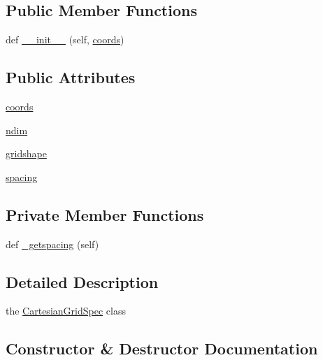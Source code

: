 \subsection*{Public Member Functions}
\begin{DoxyCompactItemize}
\item 
def \hyperlink{classMain__PDE__Repo_1_1src_1_1grid_1_1CartesianGridSpec_a498dc52b08d571018cab1684316284a3}{\+\_\+\+\_\+init\+\_\+\+\_\+} (self, \hyperlink{classMain__PDE__Repo_1_1src_1_1grid_1_1CartesianGridSpec_adf422e34fb909d26139dfb3db38f9582}{coords})
\end{DoxyCompactItemize}
\subsection*{Public Attributes}
\begin{DoxyCompactItemize}
\item 
\hyperlink{classMain__PDE__Repo_1_1src_1_1grid_1_1CartesianGridSpec_adf422e34fb909d26139dfb3db38f9582}{coords}
\item 
\hyperlink{classMain__PDE__Repo_1_1src_1_1grid_1_1CartesianGridSpec_a67aedcf0f66a3c94c10bd8129011592b}{ndim}
\item 
\hyperlink{classMain__PDE__Repo_1_1src_1_1grid_1_1CartesianGridSpec_a1a5feea284988ffe55d598a93c1cc524}{gridshape}
\item 
\hyperlink{classMain__PDE__Repo_1_1src_1_1grid_1_1CartesianGridSpec_a3f6d8ebd0c81cce8fc602ff730608367}{spacing}
\end{DoxyCompactItemize}
\subsection*{Private Member Functions}
\begin{DoxyCompactItemize}
\item 
def \hyperlink{classMain__PDE__Repo_1_1src_1_1grid_1_1CartesianGridSpec_a1204b77f4cddf3247c6c07e7fc6e1b4b}{\+\_\+getspacing} (self)
\end{DoxyCompactItemize}


\subsection{Detailed Description}
the \hyperlink{classMain__PDE__Repo_1_1src_1_1grid_1_1CartesianGridSpec}{Cartesian\+Grid\+Spec} class 

\subsection{Constructor \& Destructor Documentation}
\mbox{\label{classMain__PDE__Repo_1_1src_1_1grid_1_1CartesianGridSpec_a498dc52b08d571018cab1684316284a3}} 
